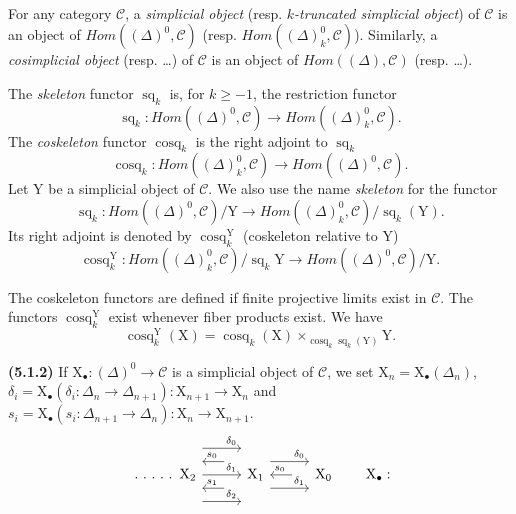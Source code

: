 \documentclass[11pt,leqno]{article}
\newcommand{\Page}[1]{\ifvmode\noindent\else\unskip\ \fi{\footnotesize\textcolor{gray}{[p.\,#1]}}\ \ignorespaces}
\begin{document}
\Page{9}

For any category \(\mathscr{C}\), a \textit{simplicial object} (resp. \textit{\(k\)-truncated simplicial object}) of \(\mathscr{C}\) is an object of \(\mathit{Hom}((\Delta)^0,\mathscr{C})\) (resp. \(\mathit{Hom}((\Delta)_k^0,\mathscr{C})\)). Similarly, a \textit{cosimplicial object} (resp. …) of \(\mathscr{C}\) is an object of \(\mathit{Hom}((\Delta),\mathscr{C})\) (resp. …).

The \textit{skeleton} functor \(\operatorname{sq}_k\) is, for \(k\geq-1\), the restriction functor
\[
\operatorname{sq}_k:\mathit{Hom}((\Delta)^0,\mathscr{C})
\to\mathit{Hom}((\Delta)_k^0,\mathscr{C}).
\]
The \textit{coskeleton} functor \(\operatorname{cosq}_k\) is the right adjoint to \(\operatorname{sq}_k\)
\[
\operatorname{cosq}_k:\mathit{Hom}((\Delta)_k^0,\mathscr{C})
\to\mathit{Hom}((\Delta)^0,\mathscr{C}).
\]
Let \(\mathrm{Y}\) be a simplicial object of \(\mathscr{C}\). We also use the name \textit{skeleton} for the functor
\[
\operatorname{sq}_k:\mathit{Hom}((\Delta)^0,\mathscr{C})/\mathrm{Y}
\to\mathit{Hom}((\Delta)_k^0,\mathscr{C})/\operatorname{sq}_k(\mathrm{Y}).
\]
Its right adjoint is denoted by \(\operatorname{cosq}_k^{\mathrm{Y}}\) (coskeleton relative to \(\mathrm{Y}\))
\[
\operatorname{cosq}_k^{\mathrm{Y}}:
\mathit{Hom}((\Delta)_k^0,\mathscr{C})/\operatorname{sq}_k\mathrm{Y}
\to\mathit{Hom}((\Delta)^0,\mathscr{C})/\mathrm{Y}.
\]

The coskeleton functors are defined if finite projective limits exist in \(\mathscr{C}\). The functors \(\operatorname{cosq}_k^{\mathrm{Y}}\) exist whenever fiber products exist. We have
\[
\operatorname{cosq}_k^{\mathrm{Y}}(\mathrm{X})
=\operatorname{cosq}_k(\mathrm{X})
\times_{\operatorname{cosq}_k\operatorname{sq}_k(\mathrm{Y})}\mathrm{Y}.
\]

\textbf{(5.1.2)} If \(\mathrm{X}_{\bullet}:(\Delta)^0\to\mathscr{C}\) is a simplicial object of \(\mathscr{C}\), we set \(\mathrm{X}_n=\mathrm{X}_{\bullet}(\Delta_n)\), \(\delta_i=\mathrm{X}_{\bullet}(\delta_i:\Delta_n\to\Delta_{n+1}):\mathrm{X}_{n+1}\to\mathrm{X}_n\) and \(s_i=\mathrm{X}_{\bullet}(s_i:\Delta_{n+1}\to\Delta_n):\mathrm{X}_n\to\mathrm{X}_{n+1}\).
\[
\begin{tikzcd}[column sep=2.8em]
\ldotp\,\ldotp\,\ldotp\,\ldotp\,\ldotp\ \mathrm{X}_2
  \arrow[r, shift left=4.4ex, "\delta_0"{near end}]
  \arrow[r, "\delta_1"{near end}]
  \arrow[r, shift right=4.4ex, "\delta_2"{near end}]
&
\mathrm{X}_1
  \arrow[l, shift right=2.2ex, shorten <=1.2em, "s_0"'{near end}]
  \arrow[l, shift left=2.2ex, shorten <=1.2em, "s_1"'{near end}]
  \arrow[r, shift left=2.2ex, "\delta_0"{near end}]
  \arrow[r, shift right=2.2ex, "\delta_1"{near end}]
&
\mathrm{X}_0
  \arrow[l, shorten <=1.2em, "s_0"'{near end}]
\end{tikzcd}
\tag*{\(\mathrm{X}_{\bullet}:\)}
\]
\end{document}
